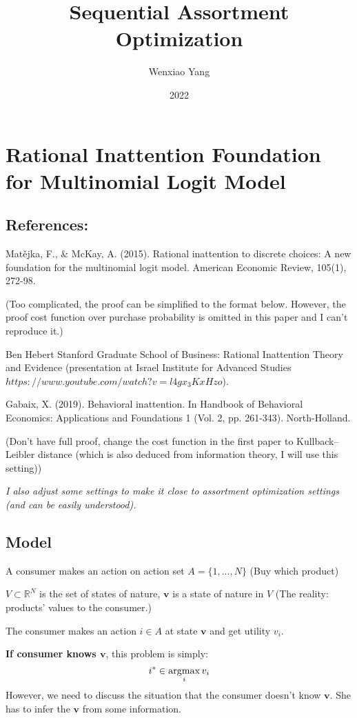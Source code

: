 \documentclass[11pt,a4paper]{article}
\title{Sequential Assortment Optimization}
\author[*]{Wenxiao Yang}
\affil[*]{Department of Mathematics, University of Illinois at Urbana-Champaign}
\date{2022}
\newcommand{\argmax}{\operatornamewithlimits{argmax}}
\begin{document}
\maketitle


\section{Rational Inattention Foundation for Multinomial Logit Model}
\subsection{References:}

Matějka, F., \& McKay, A. (2015). Rational inattention to discrete choices: A new foundation for the multinomial logit model. American Economic Review, 105(1), 272-98.

(Too complicated, the proof can be simplified to the format below. However, the proof cost function over purchase probability is omitted in this paper and I can't reproduce it.)

Ben Hebert Stanford Graduate School of Business: Rational Inattention Theory and Evidence (presentation at Israel Institute for Advanced Studies $https://www.youtube.com/watch?v=l4gx_3KxHzo$).

Gabaix, X. (2019). Behavioral inattention. In Handbook of Behavioral Economics: Applications and Foundations 1 (Vol. 2, pp. 261-343). North-Holland.

(Don't have full proof, change the cost function in the first paper to Kullback–Leibler distance (which is also deduced from information theory, I will use this setting))

\textit{I also adjust some settings to make it close to assortment optimization settings (and can be easily understood).}

\subsection{Model}
A consumer makes an action on action set $A=\{1,...,N\}$ (Buy which product)

$V\subset \mathbb{R}^N$ is the set of states of nature, $\mathbf{v}$ is a state of nature in $V$ (The reality: products' values to the consumer.)

The consumer makes an action $i\in A$ at state $\mathbf{v}$ and get utility $v_i$.

\textbf{If consumer knows $\mathbf{v}$}, this problem is simply: $$i^*\in \argmax_i v_i$$ However, we need to discuss the situation that the consumer doesn't know $\mathbf{v}$. She has to infer the $\mathbf{v}$ from some information.
\end{document}
